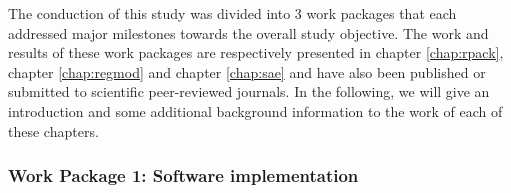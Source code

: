 The conduction of this study was divided into 3 work packages that each addressed major milestones towards the overall study objective. The work and results of these work packages are respectively presented in chapter \ref{chap:rpack}, chapter \ref{chap:regmod} and chapter \ref{chap:sae} and have also been published or submitted to scientific peer-reviewed journals. In the following, we will give an introduction and some additional background information to the work of each of these chapters.


\subsubsection{Work Package 1: Software implementation} %


